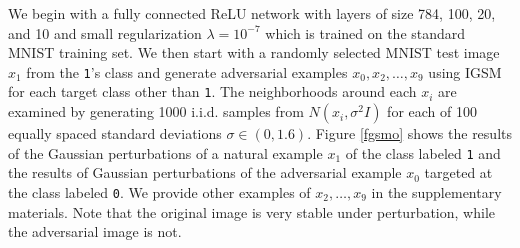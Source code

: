 We begin with a fully connected ReLU network with layers of size 784, 100, 20, and 10 and small regularization $\lambda = 10^{-7}$ which is trained on the standard MNIST training set. We then start with a randomly selected MNIST test image $x_1$ from the \texttt{1}'s class and generate adversarial examples $x_0,x_2,\dots,x_9$ using IGSM for each target class other than \texttt{1}. The neighborhoods around each $x_i$ are examined by generating 1000 i.i.d. samples from $N(x_i,\sigma^2I)$ for each of 100 equally spaced standard deviations $\sigma\in(0,1.6)$. Figure \ref{fgsmo} shows the results of the Gaussian perturbations of a natural example $x_1$ of the class labeled \texttt{1} and the results of Gaussian perturbations of the adversarial example $x_0$ targeted at the class labeled \texttt{0}. We provide other examples of $x_2,\ldots,x_9$ in the supplementary materials. Note that the original image is very stable under perturbation, while the adversarial image is not. 




